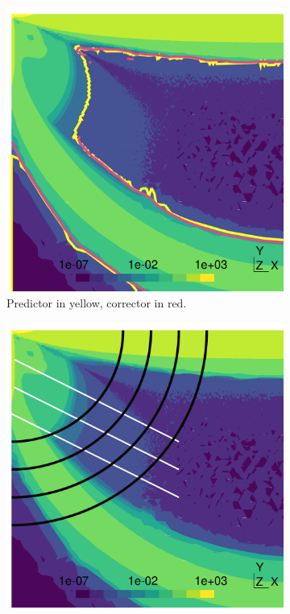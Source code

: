 \documentclass[11 pt]{report}
\begin{document}
\begin{figure}
    \centering
    \begin{subfigure}[t]{0.495\textwidth}
        \includegraphics[width=\textwidth]{../figures/correction_1.pdf}
        \caption{Predictor in yellow, corrector in red.}
    \end{subfigure}
    \begin{subfigure}[t]{0.495\textwidth}
        \includegraphics[width=\textwidth]{../figures/correction_2.pdf}

\end{subfigure}
\end{figure}
\end{document}
